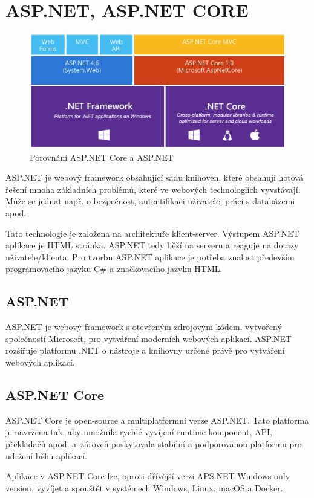 \documentclass[a4paper, 12pt]{report}
\begin{document}
		\section{ASP.NET, ASP.NET CORE}
			\begin{figure}[h!]
				\includegraphics[width=\textwidth]{aspnetcore_aspnet}
				\caption{Porovnání ASP.NET Core a ASP.NET \cite{ASPNETCORE_ASPNET}}
				\label{ASP.NET Core a ASP.NET}
			\end{figure}
			ASP.NET je webový framework obsahující sadu knihoven, které obsahují hotová řešení mnoha základních problémů, které ve webových technologiích vyvstávají. Může se jednat např. o bezpečnost, autentifikaci uživatele, práci s databázemi apod.\par
			Tato technologie je založena na architektuře klient-server. Výstupem ASP.NET aplikace je HTML stránka. ASP.NET tedy běží na serveru a reaguje na dotazy uživatele/klienta. Pro tvorbu ASP.NET aplikace je potřeba znalost především programovacího jazyku C\# a značkovacího jazyku HTML.\cite{ASP.NET_Lekce1}
			\subsection{ASP.NET}
            ASP.NET je webový framework s otevřeným zdrojovým kódem, vytvořený společností Microsoft, pro vytváření moderních webových aplikací. ASP.NET rozšiřuje platformu .NET o nástroje a knihovny určené právě pro vytváření webových aplikací.\cite{ASP.NET}
			\subsection{ASP.NET Core}
            ASP.NET Core je open-source a multiplatformní verze ASP.NET. Tato platforma je navržena tak, aby umožnila rychlé vyvíjení runtime komponent, API, překladačů apod. a~zároveň poskytovala stabilní a podporovanou platformu pro udržení běhu aplikací.\par
			Aplikace v ASP.NET Core lze, oproti dřívější verzi APS.NET Windows-only version, vyvíjet a spouštět v systémech Windows, Linux, macOS a Docker.\cite{ASP.NET_Core}
\end{document}
